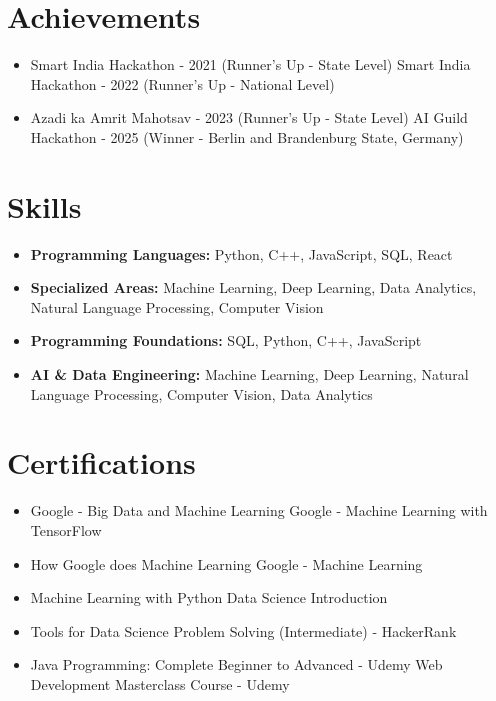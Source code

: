 \documentclass[a4paper,10pt]{article}
\begin{document}
\section*{Achievements}
\begin{itemize}
\item Smart India Hackathon - 2021 (Runner's Up - State Level) \hfill Smart India Hackathon - 2022 (Runner's Up - National Level)
\item Azadi ka Amrit Mahotsav - 2023 (Runner's Up - State Level) \hfill AI Guild Hackathon - 2025 (Winner - Berlin and Brandenburg State, Germany)
\end{itemize}

\section*{Skills}
\begin{itemize}
  \item \textbf{Programming Languages:} Python, C++, JavaScript, SQL, React
  \item \textbf{Specialized Areas:} Machine Learning, Deep Learning, Data Analytics, Natural Language Processing, Computer Vision
  \item \textbf{Programming Foundations:} SQL, Python, C++, JavaScript
  \item \textbf{AI \& Data Engineering:} Machine Learning, Deep Learning, Natural Language Processing, Computer Vision, Data Analytics
\end{itemize}

\section*{Certifications}
\begin{itemize}
\item Google - Big Data and Machine Learning \hfill Google - Machine Learning with TensorFlow
\item How Google does Machine Learning \hfill Google - Machine Learning
\item Machine Learning with Python \hfill Data Science Introduction
\item Tools for Data Science \hfill Problem Solving (Intermediate) - HackerRank
\item Java Programming: Complete Beginner to Advanced - Udemy \hfill Web Development Masterclass Course - Udemy
\end{itemize}
\end{document}

